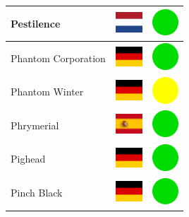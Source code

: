 \documentclass[12pt, a4paper, twoside]{report}
\begin{document}
\begin{center}
\begin{longtable}{|p{5cm}|p{2cm}|p{2cm}|}
 Pestilence                                                 & \includegraphics[width=1cm]{../img/flags/nl} &   \includegraphics[width=1cm]{../likes/y} \\ \hline
 Phantom Corporation                                        & \includegraphics[width=1cm]{../img/flags/de} &   \includegraphics[width=1cm]{../likes/y} \\ \hline
 Phantom Winter                                             & \includegraphics[width=1cm]{../img/flags/de} &   \includegraphics[width=1cm]{../likes/m} \\ \hline
 Phrymerial                                                 & \includegraphics[width=1cm]{../img/flags/es} &   \includegraphics[width=1cm]{../likes/y} \\ \hline
 Pighead                                                    & \includegraphics[width=1cm]{../img/flags/de} &   \includegraphics[width=1cm]{../likes/y} \\ \hline
 Pinch Black                                                & \includegraphics[width=1cm]{../img/flags/de} &   \includegraphics[width=1cm]{../likes/y} \\ \hline

\end{longtable}
\end{center}
\end{document}

